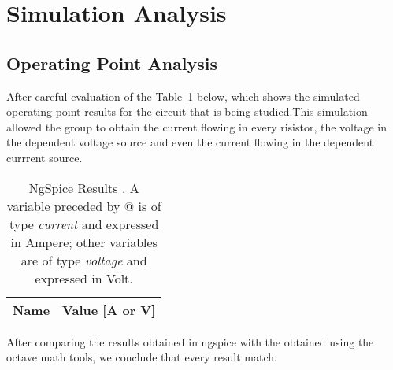 
\section{Simulation Analysis}
\label{sec:simulation}

\subsection{Operating Point Analysis}

After careful evaluation of the Table~\ref{tab:op} below, which shows the simulated operating point results for the circuit that is being studied.This simulation allowed the group to obtain the current flowing in every risistor, the voltage in the dependent voltage source and even the current flowing in the dependent currrent source. 
\begin{table}[h]
  \centering
  \begin{tabular}{|l|r|}
    \hline    
    {\bf Name} & {\bf Value [A or V]} \\ \hline
    
  \end{tabular}
  \caption{NgSpice Results . A variable preceded by @ is of type {\em current}
    and expressed in Ampere; other variables are of type {\it voltage} and expressed in
    Volt.}
  \label{tab:op}
\end{table}

After comparing the results obtained in ngspice with the obtained using the octave math tools, we conclude that every result match.



